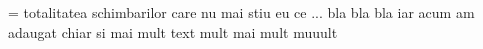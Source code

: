 \documentclass[preview]{standalone}
\begin{document}
\begin{center}
= totalitatea schimbarilor care nu mai stiu eu ce ... bla bla bla iar acum am adaugat chiar si mai mult text mult mai mult muuult
\end{center}
\end{document}
